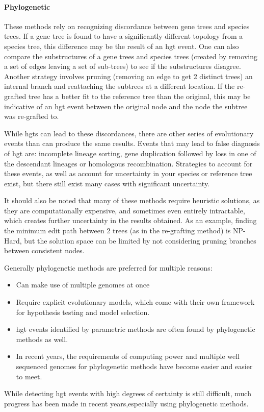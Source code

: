 \documentclass[12pt,letter]{article}
\begin{document}
\paragraph{Phylogenetic}
These methods rely on recognizing discordance between gene trees and species trees.
If a gene tree is found to have a significantly different topology from a species tree, this difference may be the result of an \ac{hgt} event\citep{hgterr}.
One can also compare the substructures of a gene trees and species trees (created by removing a set of edges leaving a set of sub-trees) to see if the substructures disagree\citep{ihgt}.
Another strategy involves pruning (removing an edge to get 2 distinct trees) an internal branch and reattaching the subtrees at a different location.
If the re-grafted tree has a better fit to the reference tree than the original, this may be indicative of an \ac{hgt} event between the original node and the node the subtree was re-grafted to\citep{ihgt}.\par
While \ac{hgt}s can lead to these discordances, there are other series of evolutionary events than can produce the same results\citep{hgterr}.
Events that may lead to false diagnosis of \ac{hgt} are: incomplete lineage sorting, gene duplication followed by loss in one of the descendant lineages or homologous recombination\citep{ihgt,hgterr}.
Strategies to account for these events, as well as account for uncertainty in your species or reference tree exist, but there still exist many cases with significant uncertainty\citep{hgterr}.\par
It should also be noted that many of these methods require heuristic solutions, as they are computationally expensive, and sometimes even entirely intractable, which creates further uncertainty in the results obtained\citep{ihgt}.
As an example, finding the minimum edit path between 2 trees (as in the re-grafting method) is NP-Hard, but the solution space can be limited by not considering pruning branches between consistent nodes\citep{sprnp,ihgt}.\par\par
Generally phylogenetic methods are preferred for multiple reasons:
\begin{itemize}
    \item Can make use of multiple genomes at once\citep{ihgt}
    \item Require explicit evolutionary models, which come with their own framework for hypothesis testing and model selection\citep{ihgt}.
    \item \ac{hgt} events identified by parametric methods are often found by phylogenetic methods as well\citep{ihgt}.
    \item In recent years, the requirements of computing power and  multiple well sequenced genomes for phylogenetic methods have become easier and easier to meet\citep{ihgt}.
\end{itemize}
While detecting \ac{hgt} events with high degrees of certainty is still difficult, much progress has been made in recent years,especially using phylogenetic methods\citep{ihgt}.
\end{document}
